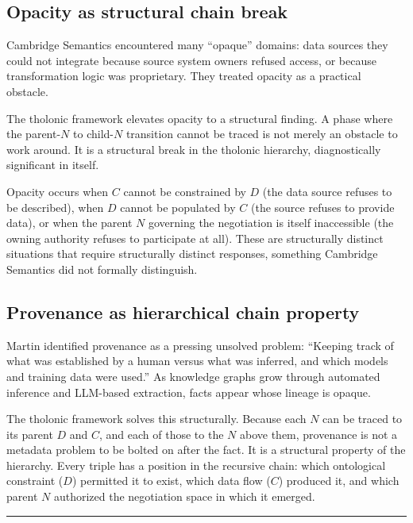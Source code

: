 \documentclass[12pt]{article}
\begin{document}
\subsection{Opacity as structural chain break}\label{opacity-as-structural-chain-break}

Cambridge Semantics encountered many ``opaque'' domains: data sources
they could not integrate because source system owners refused access, or
because transformation logic was proprietary. They treated opacity as a
practical obstacle.

The tholonic framework elevates opacity to a structural finding. A phase
where the parent-\(N\) to child-\(N\) transition cannot be traced is not
merely an obstacle to work around. It is a structural break in the
tholonic hierarchy, diagnostically significant in itself.

Opacity occurs when \(C\) cannot be constrained by \(D\) (the data
source refuses to be described), when \(D\) cannot be populated by \(C\)
(the source refuses to provide data), or when the parent \(N\) governing
the negotiation is itself inaccessible (the owning authority refuses to
participate at all). These are structurally distinct situations that
require structurally distinct responses, something Cambridge Semantics
did not formally distinguish.

\subsection{Provenance as hierarchical chain property}\label{provenance-as-hierarchical-chain-property}

Martin identified provenance as a pressing unsolved problem: ``Keeping
track of what was established by a human versus what was inferred, and
which models and training data were used.'' As knowledge graphs grow
through automated inference and LLM-based extraction, facts appear whose
lineage is opaque.

The tholonic framework solves this structurally. Because each \(N\) can
be traced to its parent \(D\) and \(C\), and each of those to the \(N\)
above them, provenance is not a metadata problem to be bolted on after
the fact. It is a structural property of the hierarchy. Every triple has
a position in the recursive chain: which ontological constraint (\(D\))
permitted it to exist, which data flow (\(C\)) produced it, and which
parent \(N\) authorized the negotiation space in which it emerged.

\begin{center}\rule{0.5\linewidth}{0.5pt}\end{center}
\end{document}
